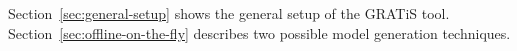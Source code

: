 Section~\ref{sec:general-setup} shows the general setup of the GRATiS tool. Section~\ref{sec:offline-on-the-fly} describes two possible model generation techniques.
